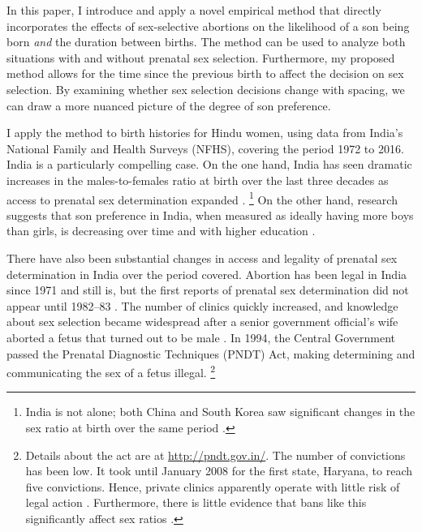 \documentclass[12pt,letterpaper]{article}
\begin{document}
In this paper, I introduce and apply a novel empirical method that directly incorporates 
the effects of sex-selective abortions on the likelihood of a son being born 
\emph{and} the duration between births.
The method can be used to analyze both situations with and without prenatal
sex selection.
Furthermore, my proposed method allows for the time since the previous 
birth to affect the decision on sex selection.
By examining whether sex selection decisions change with spacing, we can 
draw a more nuanced picture of the degree of son preference.

I apply the method to birth histories for Hindu women, using data from 
India's National Family and Health Surveys (NFHS), covering the period 
1972 to 2016. 
India is a particularly compelling case.
On the one hand, India has seen dramatic increases in the males-to-females ratio 
at birth over the last three decades as access to prenatal sex determination 
expanded 
\citep{das_gupta97,Sudha1999,Arnold2002,retherford03b,jha06}.%
\footnote{
India is not alone; both China and South Korea saw
significant changes in the sex ratio at birth over the same period 
\citep{Yi1993,park95}.
}
On the other hand, research suggests that son preference in 
India, when measured as ideally having more boys than girls, is decreasing 
over time and with higher education \citep{bhat03,pande07}.

There have also been substantial changes in access and legality of
prenatal sex determination in India over the period covered.
Abortion has been legal in India since 1971 and still is, but the 
first reports of prenatal sex determination did
not appear until 1982--83 \citep{Sudha1999,bhat06,Grover2006}.
The number of clinics quickly increased, and knowledge about sex selection 
became widespread after a senior government official's wife aborted a 
fetus that turned out to be male \citep[p.\ 598]{Sudha1999}.
In 1994, the Central Government passed the Prenatal Diagnostic Techniques 
(PNDT) Act, making determining and communicating the sex of a fetus illegal.%
\footnote{
Details about the act are at \href{http://pndt.gov.in/}{http://pndt.gov.in/}.
The number of convictions has been low.
It took until January 2008 for the first state, Haryana, to reach five convictions.
Hence, private clinics apparently operate with little risk of legal action 
\citep{Sudha1999}.
Furthermore, there is little evidence that bans like this significantly
affect sex ratios \citep{Das-Gupta2016}.
}
\end{document}
